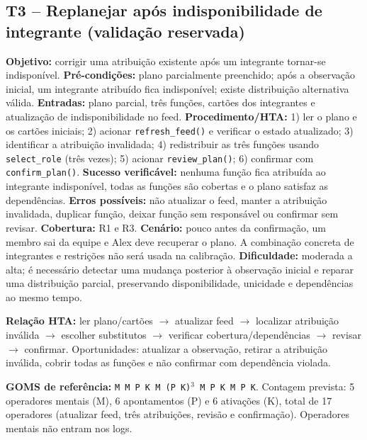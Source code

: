 \documentclass[conference]{IEEEtran}
\begin{document}
\subsection{T3 -- Replanejar após indisponibilidade de integrante (validação reservada)}
\textbf{Objetivo:} corrigir uma atribuição existente após um integrante tornar-se indisponível. \textbf{Pré-condições:} plano parcialmente preenchido; após a observação inicial, um integrante atribuído fica indisponível; existe distribuição alternativa válida. \textbf{Entradas:} plano parcial, três funções, cartões dos integrantes e atualização de indisponibilidade no feed. \textbf{Procedimento/HTA:} 1) ler o plano e os cartões iniciais; 2) acionar \texttt{refresh\_feed()} e verificar o estado atualizado; 3) identificar a atribuição invalidada; 4) redistribuir as três funções usando \texttt{select\_role} (três vezes); 5) acionar \texttt{review\_plan()}; 6) confirmar com \texttt{confirm\_plan()}. \textbf{Sucesso verificável:} nenhuma função fica atribuída ao integrante indisponível, todas as funções são cobertas e o plano satisfaz as dependências. \textbf{Erros possíveis:} não atualizar o feed, manter a atribuição invalidada, duplicar função, deixar função sem responsável ou confirmar sem revisar. \textbf{Cobertura:} R1 e R3. \textbf{Cenário:} pouco antes da confirmação, um membro sai da equipe e Alex deve recuperar o plano. A combinação concreta de integrantes e restrições não será usada na calibração. \textbf{Dificuldade:} moderada a alta; é necessário detectar uma mudança posterior à observação inicial e reparar uma distribuição parcial, preservando disponibilidade, unicidade e dependências ao mesmo tempo.

\textbf{Relação HTA:} ler plano/cartões $\rightarrow$ atualizar feed $\rightarrow$ localizar atribuição inválida $\rightarrow$ escolher substitutos $\rightarrow$ verificar cobertura/dependências $\rightarrow$ revisar $\rightarrow$ confirmar. Oportunidades: atualizar a observação, retirar a atribuição inválida, cobrir todas as funções e não confirmar com dependência violada.

\textbf{GOMS de referência:} \texttt{M M P K M (P K)$^3$ M P K M P K}. Contagem prevista: 5 operadores mentais (M), 6 apontamentos (P) e 6 ativações (K), total de 17 operadores (atualizar feed, três atribuições, revisão e confirmação). Operadores mentais não entram nos logs.
\end{document}
